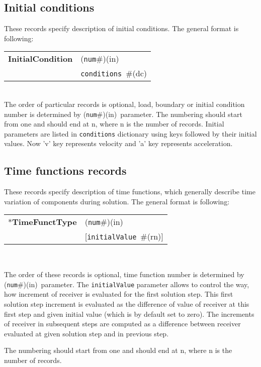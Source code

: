 \documentclass[a4paper]{article}
\makeatletter
\newcommand{\param}[1]{\texttt{#1}} %
\newcommand{\optional}[1]{[#1]} %
\newcommand{\field}[2]{\param{#1}~\#{\tiny(#2)}} %
\newcommand{\optField}[2]{\optional{\field{#1}{#2}}}
\newcommand{\componentNum}{(\param{num}\#){\tiny(in)}} %
\newcommand{\entKeyword}[1]{*\textbf{#1}} %
\newcommand{\entKeywordInst}[1]{\textbf{#1}} %
\newenvironment{record}[1][]{\begin{tabular}{|ll}}{\end{tabular}\\}
\newcommand{\recentry}[2]{{#1}&{#2}\\}
\newcounter{rcc}
\newenvironment{record}[1][\textwidth]{\setcounter{rcc}{0}\begin{tabular*}{#1}{|ll@{\extracolsep{\fill}}r}}{\end{tabular*}\\}
\newcommand{\recentry}[2]{\ifthenelse{\value{rcc}>0}{&$\backslash$ \\}{\setcounter{rcc}{1}}{#1}&{#2}}
\makeatother
\begin{document}
\subsection{Initial conditions}
\label{_InitialConditions}
These records specify description of initial conditions. The general format is
following:

\noindent
\begin{record}
  \recentry{\entKeywordInst{InitialCondition}}{\componentNum}
  \recentry{}{\field{conditions}{dc}}
\end{record}
The order of particular  records is optional, load, boundary or initial condition number is determined by \componentNum\ parameter.
The numbering should start from one and should end at n, where n is the number of records.
Initial parameters are listed in \param{conditions} dictionary using keys followed by their initial values.
Now 'v' key represents velocity and 'a' key represents acceleration.



\subsection{Time functions records}
\label{_TimeFunctionsRecords}
These records specify description of time functions, which generally describe
time variation of components during solution. The  general format is
following:

\noindent
\begin{record}
  \recentry{\entKeyword{TimeFunctType}}{\componentNum}
  \recentry{}{\optField{initialValue}{rn}}
\end{record}

The order of these records is optional, time function number is determined by \componentNum\ parameter.
The \param{initialValue} parameter allows to control the way, how increment of receiver is evaluated for the first solution step.
This first solution step increment is evaluated as the difference of value of receiver at this first step and given initial value (which is by default set to zero).
The increments of receiver in subsequent steps are computed as a difference between receiver evaluated at given solution step and in previous step.

The numbering should start from one and should end at n, where n is the number of records.
\end{document}
